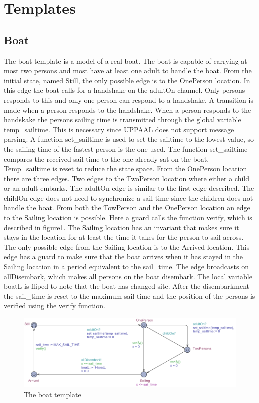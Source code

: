 \section{Templates}




\subsection{Boat}
The boat template is a model of a real boat. 
The boat is capable of carrying at most two persons and most have at least one adult to handle the boat. 
From the initial state, named Still, the only possible edge is to the OnePerson location. 
In this edge the boat calls for a handshake on the adultOn channel. 
Only persons responds to this and only one person can respond to a handshake.
A transition is made when a person responds to the handshake.  
When a person responds to the handskake the persons sailing time is transmitted through the global variable temp\_sailtime. 
This is necessary since UPPAAL does not support message parsing. 
A function set\_sailtime is used to set the sailtime to the lowest value, so the sailing time of the fastest person is the one used. 
The function set\_sailtime compares the received sail time to the one already sat on the boat. 
Temp\_sailtime is reset to reduce the state space.
From the OnePerson location there are three edges. 
Two edges to the TwoPerson location where either a child or an adult embarks. 
The adultOn edge is similar to the first edge described. 
The childOn edge does not need to synchronize a sail time since the children does not handle the boat. 
From both the TowPerson and the OnePerson location an edge to the Sailing location is possible. 
Here a guard calls the function verify, which is described in figure\ref{fig:boat}. 
The Sailing location has an invariant that makes sure it stays in the location for at least the time it takes for the person to sail across. 
The only possible edge from the Sailing location is to the Arrived location. 
This edge has a guard to make sure that the boat arrives when it has stayed in the Sailing location in a period equivalent to the sail\_time. 
The edge broadcasts on allDisembark, which makes all persons on the boat disembark. 
The local variable boatL is fliped to note that the boat has changed site. 
After the disembarkment the sail\_time is reset to the maximum sail time and the position of the persons is verified using the verify function. 
\begin{figure}%
\includegraphics[width=\columnwidth]{pictures/boat.png}%
\caption{The boat template}%
\label{fig:boat}%
\end{figure}
